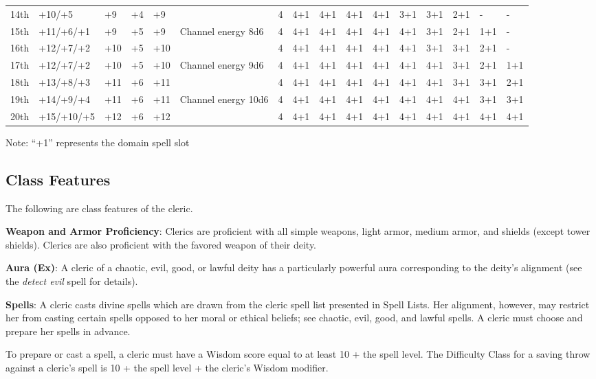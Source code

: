 \begin{table*}[]
\begin{tabularx}{\linewidth}{lp{6em}p{2.5em}p{2.5em}p{2.5em}Xllllllllll}
14th & +10/+5 & +9 & +4 & +9 &  & 4 & 4+1 & 4+1 & 4+1 & 4+1 & 3+1 & 3+1 & 2+1 & - & -\\
15th & +11/+6/+1 & +9 & +5 & +9 & Channel energy 8d6 & 4 & 4+1 & 4+1 & 4+1 & 4+1 & 4+1 & 3+1 & 2+1 & 1+1 & -\\
16th & +12/+7/+2 & +10 & +5 & +10 &  & 4 & 4+1 & 4+1 & 4+1 & 4+1 & 4+1 & 3+1 & 3+1 & 2+1 & -\\
17th & +12/+7/+2 & +10 & +5 & +10 & Channel energy 9d6 & 4 & 4+1 & 4+1 & 4+1 & 4+1 & 4+1 & 4+1 & 3+1 & 2+1 & 1+1\\
18th & +13/+8/+3 & +11 & +6 & +11 &  & 4 & 4+1 & 4+1 & 4+1 & 4+1 & 4+1 & 4+1 & 3+1 & 3+1 & 2+1\\
19th & +14/+9/+4 & +11 & +6 & +11 & Channel energy 10d6 & 4 & 4+1 & 4+1 & 4+1 & 4+1 & 4+1 & 4+1 & 4+1 & 3+1 & 3+1\\
20th & +15/+10/+5 & +12 & +6 & +12 &  & 4 & 4+1 & 4+1 & 4+1 & 4+1 & 4+1 & 4+1 & 4+1 & 4+1 & 4+1\\
\end{tabularx}
 Note: ``+1'' represents the domain spell slot\\
\end{table*}

\subsection{Class Features}

The following are class features of the cleric.

\textbf{Weapon and Armor Proficiency}: Clerics are proficient with all simple weapons, light armor, medium armor,
    and shields (except tower shields). Clerics are also proficient with the favored weapon of their deity.

\textbf{Aura (Ex)}: A cleric of a chaotic, evil, good, or lawful deity has a particularly powerful aura 
    corresponding to the deity's alignment (see the \textit{detect evil} spell for details).

\textbf{Spells}: A cleric casts divine spells which are drawn from the cleric spell list presented in Spell Lists.
Her alignment, however, may restrict her from casting certain spells opposed to her moral or ethical beliefs; see
chaotic, evil, good, and lawful spells. A cleric must choose and prepare her spells in advance.

To prepare or cast a spell, a cleric must have a Wisdom score equal to at least 10 + the spell level. The Difficulty
    Class for a saving throw against a cleric's spell is 10 + the spell level + the cleric's Wisdom modifier.

